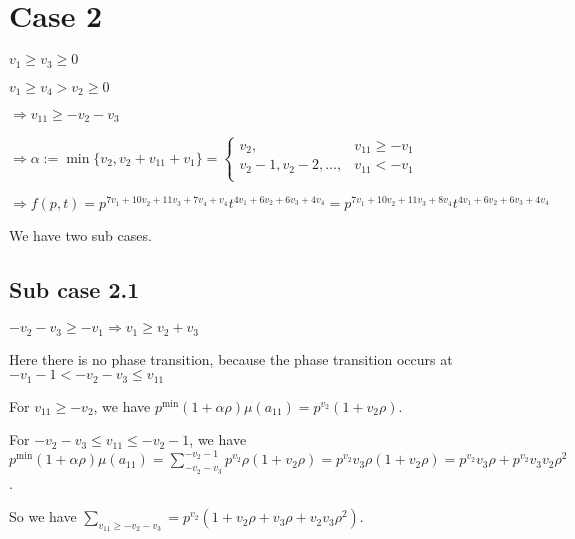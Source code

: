 \documentclass{article}
\begin{document}
\section{Case 2}
$v_1\geq{v_3}\geq{0}$

$v_1\geq{v_4}>v_2\geq{0}$

$\Rightarrow{v_{11}}\geq{-v_2-v_3}$

$\Rightarrow\alpha:=\min\{v_2,v_2+v_{11}+v_1\}=\begin{cases}
       v_2, & v_{11}\geq{-v_1}\\
       v_2-1,v_2-2,\dots, & v_{11}<{-v_1}\\
     \end{cases}$

     $\Rightarrow{f(p,t)=p^{7v_1+10v_2+11v_3+7v_4+v_4}t^{4v_1+6v_2+6v_3+4v_4}=p^{7v_1+10v_2+11v_3+8v_4}t^{4v_1+6v_2+6v_3+4v_4}}$

We have two sub cases.
\subsection{Sub case 2.1}
$-v_2-v_3\geq{-v_1}\Rightarrow{v_1\geq{v_2+v_3}}$

Here there is no phase transition, because the phase transition occurs at $-v_1-1<{-v_2-v_3}\leq{v_{11}}$

For $v_{11}\geq{-v_2}$, we have $p^{\min}(1+\alpha\rho)\mu(a_{11})=p^{v_2}(1+v_2\rho)$.

For $-v_2-v_3\leq{v_{11}}\leq{-v_2-1}$, we have $p^{\min}(1+\alpha\rho)\mu(a_{11})=\sum_{-v_2-v_3}^{-v_2-1}p^{v_2}\rho(1+v_2\rho)=p^{v_2}v_3\rho(1+v_2\rho)=p^{v_2}v_3\rho+p^{v_2}v_3v_2\rho^2$.

So we have $\sum_{v_{11}\geq{-v_2-v_3}}=p^{v_2}(1+v_2\rho+v_3\rho+v_2v_3\rho^2).$
\end{document}
